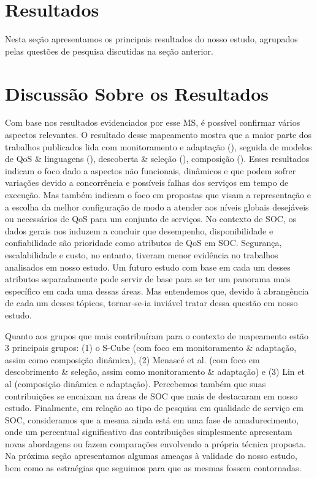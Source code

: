 \section{Resultados}\label{sec:resultados}

Nesta se\c c\~{a}o apresentamos os principais resultados do nosso
estudo, agrupados pelas quest\~{o}es de pesquisa discutidas na se\c
c\~{a}o anterior. 






\section{Discuss\~{a}o Sobre os Resultados}

Com base nos resultados evidenciados por esse MS, \'{e} poss\'{i}vel
confirmar v\'{a}rios aspectos relevantes. O resultado desse mapeamento
mostra que a maior parte dos trabalhos publicados lida com
monitoramento e adapta\c{c}\~{a}o (\MonitoramentoAdaptacao), seguida de modelos de QoS
\& linguagens (\ModelosdeQoSeLinguagens), descoberta \& sele\c{c}\~{a}o (\DescobrimentoeSelecao),
composi\c{c}\~{a}o (\Composicao). Esses resultados indicam o foco dado a aspectos n\~{a}o funcionais, din\^{a}micos e que podem sofrer varia\c{c}\~{o}es devido a concorrência e possíveis falhas dos servi\c{c}os em tempo de execu\c{c}\~{a}o. Mas tamb\'{e}m indicam o foco em propostas que visam a representa\c{c}\~{a}o e a escolha da
melhor configura\c{c}\~{a}o de modo a atender aos níveis globais
desej\'{a}veis ou necess\'{a}rios de QoS para um conjunto de
servi\c{c}os. 
No contexto de SOC, os dados gerais nos induzem a
concluir que desempenho, disponibilidade e confiabilidade s\~{a}o
prioridade como atributos de QoS em SOC. Seguran\c{c}a,
escalabilidade e custo, no entanto, tiveram menor evid\^{e}ncia no trabalhos analisados em nosso estudo. 
Um futuro estudo com base em cada um desses atributos separadamente pode servir de base para se ter um panorama
mais espec\'{i}fico em cada uma dessas \'{a}reas. Mas entendemos que, devido \`{a} abrang\^{e}ncia de cada um desses t\'{o}picos,
tornar-se-ia invi\'{a}vel tratar dessa quest\~{a}o em nosso estudo. 

Quanto aos grupos que mais contribu\'{i}ram para o contexto de
mapeamento est\~{a}o 3 principais grupos: (1) o S-Cube (com foco em
monitoramento \& adapta\c{c}\~{a}o, assim como composi\c{c}\~{a}o
din\^{a}mica), (2) Menasc\'{e} et al. (com foco em descobrimento \&
sele\c{c}\~{a}o, assim como monitoramento \& adapta\c{c}\~{a}o) e (3)
Lin et al (composi\c{c}\~{a}o din\^{a}mica e
adapta\c{c}\~{a}o). Percebemos tamb\'{e}m que suas
contribui\c{c}\~{o}es se encaixam na \'{a}reas de SOC que mais de
destacaram em nosso estudo. 
Finalmente, em rela\c c\~{a}o ao tipo de pesquisa em
qualidade de servi\c{c}o em SOC, consideramos que a mesma ainda
est\'{a} em uma fase de amadurecimento, 
onde um percentual significativo das contribui\c{c}\~{o}es
simplesmente apresentam 
novas abordagens ou fazem compara\c{c}\~{o}es envolvendo a 
própria t\'{e}cnica proposta. Na pr\'{o}xima se\c c\~{a}o apresentamos
algumas amea\c cas \`{a} validade do nosso estudo, bem como as
estra\'{e}gias que seguimos para que as mesmas
fossem contornadas.

